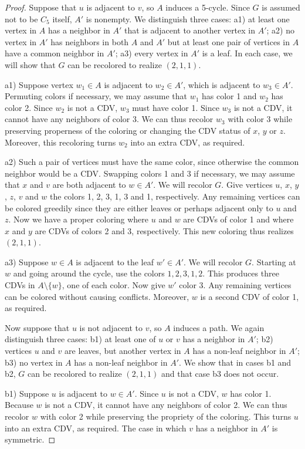 \documentclass[10pt,a4paper]{amsart}
\begin{document}
\begin{proof}
Suppose that $u$ is adjacent to $v$, so $A$ induces a 5-cycle.
Since $G$ is assumed not to be $C_5$ itself, $A'$ is nonempty.
We distinguish three cases:
a1) at least one vertex in $A$ has a neighbor in $A'$ that is adjacent to another vertex in $A'$;
a2) no vertex in $A'$ has neighbors in both $A$ and $A'$ but at least one pair of vertices in $A$ have a common neighbor in $A'$;
a3) every vertex in $A'$ is a leaf.
In each case, we will show that $G$ can be recolored to realize $(2,1,1)$.

a1)
Suppose vertex $w_1\in A$ is adjacent to $w_2\in A'$, which is adjacent to $w_3\in A'$.
Permuting colors if necessary, we may assume that $w_1$ has color 1 and $w_2$ has color 2.
Since $w_2$ is not a CDV, $w_3$ must have color 1.
Since $w_3$ is not a CDV, it cannot have any neighbors of color 3.
We can thus recolor $w_3$ with color 3 while preserving properness of the coloring or changing the CDV status of $x$, $y$ or $z$.
Moreover, this recoloring turns $w_2$ into an extra CDV, as required.

a2)
Such a pair of vertices must have the same color, since otherwise the common neighbor would be a CDV.
Swapping colors 1 and 3 if necessary, we may assume that $x$ and $v$ are both adjacent to $w\in A'$.
We will recolor $G$.
Give vertices $u$, $x$, $y$, $z$, $v$ and $w$ the colors 1, 2, 3, 1, 3 and 1, respectively.
Any remaining vertices can be colored greedily since they are either leaves or perhaps adjacent only to $u$ and $z$.
Now we have a proper coloring where $u$ and $w$ are CDVs of color 1 and where $x$ and $y$ are CDVs of colors 2 and 3, respectively.
This new coloring thus realizes $(2,1,1)$.

a3)
Suppose $w\in A$ is adjacent to the leaf $w'\in A'$.
We will recolor $G$.
Starting at $w$ and going around the cycle, use the colors $1,2,3,1,2$.
This produces three CDVs in $A\setminus\{w\}$, one of each color.
Now give $w'$ color 3.
Any remaining vertices can be colored without causing conflicts.
Moreover, $w$ is a second CDV of color 1, as required.

Now suppose that $u$ is not adjacent to $v$, so $A$ induces a path.
We again distinguish three cases:
b1) at least one of $u$ or $v$ has a neighbor in $A'$;
b2) vertices $u$ and $v$ are leaves, but another vertex in $A$ has a non-leaf neighbor in $A'$;
b3) no vertex in $A$ has a non-leaf neighbor in $A'$.
We show that in cases b1 and b2, $G$ can be recolored to realize $(2,1,1)$ and that case b3 does not occur.

b1)
Suppose $u$ is adjacent to $w\in A'$.
Since $u$ is not a CDV, $w$ has color 1.
Because $w$ is not a CDV, it cannot have any neighbors of color 2.
We can thus recolor $w$ with color 2 while preserving the propriety of the coloring.
This turns $u$ into an extra CDV, as required.
The case in which $v$ has a neighbor in $A'$ is symmetric.


\end{proof}
\end{document}
